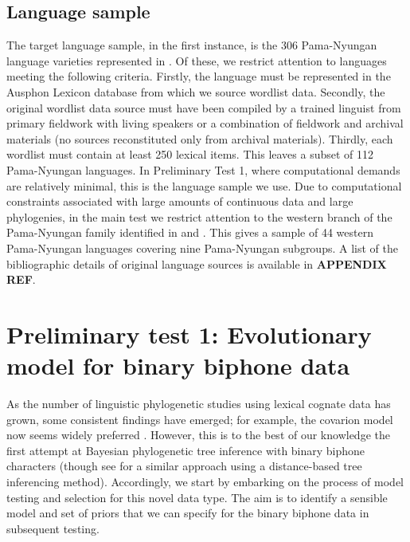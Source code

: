 \documentclass[]{article}
\begin{document}
\hypertarget{language-sample}{%
\subsection{Language sample}\label{language-sample}}

The target language sample, in the first instance, is the 306 Pama-Nyungan language varieties represented in \textcite{bouckaert_origin_2018}. Of these, we restrict attention to languages meeting the following criteria. Firstly, the language must be represented in the Ausphon Lexicon database \autocite{round_ausphon-lexicon_2017} from which we source wordlist data. Secondly, the original wordlist data source must have been compiled by a trained linguist from primary fieldwork with living speakers or a combination of fieldwork and archival materials (no sources reconstituted only from archival materials). Thirdly, each wordlist must contain at least 250 lexical items. This leaves a subset of 112 Pama-Nyungan languages. In Preliminary Test 1, where computational demands are relatively minimal, this is the language sample we use. Due to computational constraints associated with large amounts of continuous data and large phylogenies, in the main test we restrict attention to the western branch of the Pama-Nyungan family identified in \textcite{bowern_computational_2012} and \textcite{bouckaert_origin_2018}. This gives a sample of 44 western Pama-Nyungan languages covering nine Pama-Nyungan subgroups. A list of the bibliographic details of original language sources is available in \textbf{APPENDIX REF}.

\hypertarget{prelim-1}{%
\section{Preliminary test 1: Evolutionary model for binary biphone data}\label{prelim-1}}

As the number of linguistic phylogenetic studies using lexical cognate data has grown, some consistent findings have emerged; for example, the covarion model now seems widely preferred \autocites[e.g.][]{bouckaert_origin_2018}{kolipakam_bayesian_2018}{savelyev_bayesian_2020}. However, this is to the best of our knowledge the first attempt at Bayesian phylogenetic tree inference with binary biphone characters (though see \textcite{jager_inferring_2016} for a similar approach using a distance-based tree inferencing method). Accordingly, we start by embarking on the process of model testing and selection for this novel data type. The aim is to identify a sensible model and set of priors that we can specify for the binary biphone data in subsequent testing.
\end{document}
